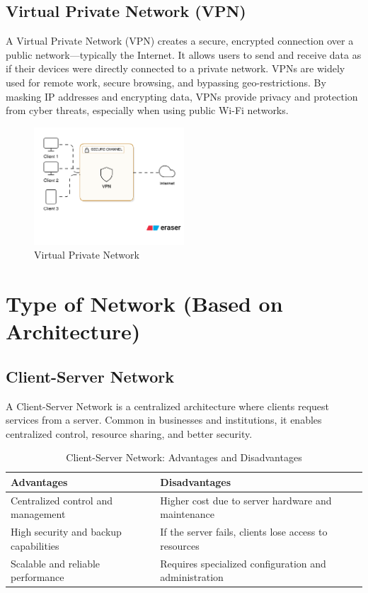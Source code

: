 \subsection{Virtual Private Network (VPN)}
A Virtual Private Network (VPN) creates a secure, encrypted connection over a public network—typically the Internet. It allows users to send and receive data as if their devices were directly connected to a private network. VPNs are widely used for remote work, secure browsing, and bypassing geo-restrictions. By masking IP addresses and encrypting data, VPNs provide privacy and protection from cyber threats, especially when using public Wi-Fi networks.

\begin{figure}[H]
    \centering
    \includegraphics[width=0.5\textwidth]{images/chapter2/vpn.png}
    \caption{Virtual Private Network}
    \label{fig:vpn}
\end{figure}


\section{Type of Network (Based on Architecture)}

\subsection{Client-Server Network}
A Client-Server Network is a centralized architecture where clients request services from a server. Common in businesses and institutions, it enables centralized control, resource sharing, and better security.

\begin{table}[H]
\centering
\caption{Client-Server Network: Advantages and Disadvantages}
\begin{tabularx}{\linewidth}{|X|X|}
\hline
\textbf{Advantages} & \textbf{Disadvantages} \\
\hline
Centralized control and management & Higher cost due to server hardware and maintenance \\
\hline
High security and backup capabilities & If the server fails, clients lose access to resources \\
\hline
Scalable and reliable performance & Requires specialized configuration and administration \\
\hline
\end{tabularx}
\end{table}

